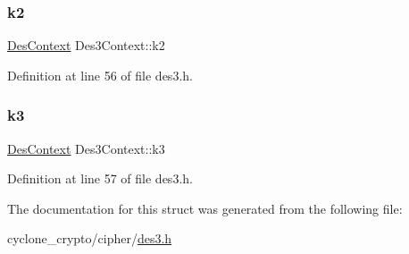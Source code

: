 \mbox{\label{structDes3Context_a68cb8fdee2e8cbd2af7cdac16201766e}} 
\subsubsection{\texorpdfstring{k2}{k2}}
{\footnotesize\ttfamily \hyperlink{structDesContext}{Des\+Context} Des3\+Context\+::k2}



Definition at line 56 of file des3.\+h.

\mbox{\label{structDes3Context_ab68be5d202fbef6ce3d5e3bb10b29a8f}} 
\subsubsection{\texorpdfstring{k3}{k3}}
{\footnotesize\ttfamily \hyperlink{structDesContext}{Des\+Context} Des3\+Context\+::k3}



Definition at line 57 of file des3.\+h.



The documentation for this struct was generated from the following file\+:\begin{DoxyCompactItemize}
\item 
cyclone\+\_\+crypto/cipher/\hyperlink{des3_8h}{des3.\+h}\end{DoxyCompactItemize}
